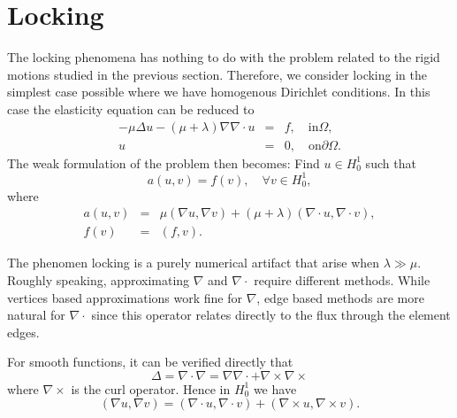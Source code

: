 \section{Locking}
\label{el:lock}
The locking phenomena has nothing to do with the problem related to the rigid motions
studied in the previous section. Therefore, we consider locking in the simplest case possible
where we have homogenous Dirichlet conditions. In this case the elasticity equation
can be reduced to
\begin{eqnarray*}
-\mu \Delta u - (\mu + \lambda) \nabla \nabla\cdot u &=& f, \quad \mbox{in} \Omega,\\
                                                   u &=& 0, \quad \mbox{on} \partial \Omega. 
\end{eqnarray*}
The weak formulation of the problem then becomes:
Find $u \in H^1_0$ such that
\[
a(u,v) = f(v), \quad \forall v \in H^1_0, 
\]
where
\begin{eqnarray}
a(u,v) &=& \mu (\nabla u, \nabla v) + (\mu + \lambda) (\nabla \cdot u, \nabla \cdot v),\\
f(v)   &=& (f, v) .
\end{eqnarray}

The phenomen locking is a purely numerical artifact that arise when $\lambda \gg \mu$.
Roughly speaking, approximating $\nabla$ and $\nabla\cdot$ require different methods.
While vertices based approximations work fine for $\nabla$, edge based methods
are more natural for $\nabla\cdot$ since this operator relates directly
to the flux through the element edges.

For smooth functions, it can be verified directly that
\[
\Delta = \nabla\cdot\nabla = \nabla\nabla\cdot + \nabla\times \nabla\times
\]
where $\nabla\times$ is the curl operator.
Hence in $H_0^1$ we have 
\[
(\nabla u,\nabla v) = (\nabla \cdot u,\nabla \cdot v) + (\nabla \times u,\nabla \times v).
\]

